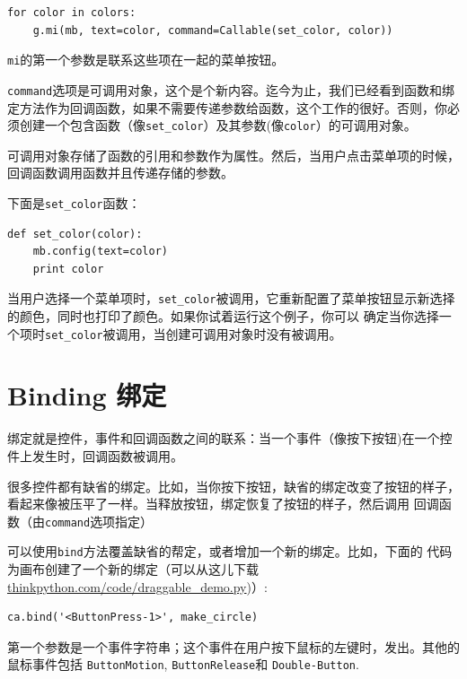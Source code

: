 \beforeverb
\begin{verbatim}
for color in colors:
    g.mi(mb, text=color, command=Callable(set_color, color))
\end{verbatim}
\afterverb

{\tt mi}的第一个参数是联系这些项在一起的菜单按钮。


{\tt command}选项是可调用对象，这个是个新内容。迄今为止，我们已经看到函数和绑定方法作为回调函数，如果不需要传递参数给函数，这个工作的很好。否则，你必须创建一个包含函数（像\verb"set_color"）及其参数(像{\tt color}）的可调用对象。


可调用对象存储了函数的引用和参数作为属性。然后，当用户点击菜单项的时候，回调函数调用函数并且传递存储的参数。

下面是\verb"set_color"函数：

\beforeverb
\begin{verbatim}
def set_color(color):
    mb.config(text=color)
    print color
\end{verbatim}
\afterverb
%

当用户选择一个菜单项时，\verb"set_color"被调用，它重新配置了菜单按钮显示新选择的颜色，同时也打印了颜色。如果你试着运行这个例子，你可以
确定当你选择一个项时\verb"set_color"被调用，当创建可调用对象时没有被调用。

\section{Binding 绑定}


绑定就是控件，事件和回调函数之间的联系：当一个事件（像按下按钮)在一个控件上发生时，回调函数被调用。

很多控件都有缺省的绑定。比如，当你按下按钮，缺省的绑定改变了按钮的样子，看起来像被压平了一样。当释放按钮，绑定恢复了按钮的样子，然后调用
回调函数（由{\tt command}选项指定）


可以使用{\tt bind}方法覆盖缺省的帮定，或者增加一个新的绑定。比如，下面的
代码为画布创建了一个新的绑定（可以从这儿下载\url{thinkpython.com/code/draggable_demo.py})）:

\beforeverb
\begin{verbatim}
ca.bind('<ButtonPress-1>', make_circle)
\end{verbatim}
\afterverb
%

第一个参数是一个事件字符串；这个事件在用户按下鼠标的左键时，发出。其他的鼠标事件包括 {\tt ButtonMotion}, {\tt ButtonRelease}和 
{\tt Double-Button}.


